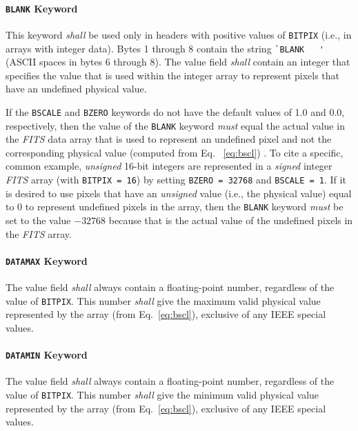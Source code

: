 \documentclass[11pt,makeidx]{book}     %
\begin{document}
   \paragraph{{\tt BLANK} Keyword}
 This keyword {\em shall} be used only in headers with
 positive values of {\tt BITPIX}  (i.e., in arrays
 with integer data). Bytes 1 through 8 contain the string 
 \verb*+`BLANK   '+ (ASCII spaces in bytes 6 through 8).  The value 
 field {\em shall} contain an integer that specifies the value that 
 is used within the integer array to represent pixels that have an
 undefined physical value. 

 If the {\tt BSCALE} and {\tt BZERO} keywords do not have the
 default values of 1.0 and 0.0, respectively, then the value of the
 {\tt BLANK} keyword {\em must} equal the actual value in the {\em
 FITS\/} data array  that is used to represent an undefined pixel
 and not the corresponding physical value (computed from Eq. \
 \ref{eq:bscl}) .  To cite a specific, common example,  {\em
 unsigned} 16-bit integers are represented in a {\em signed}
 integer {\em FITS\/} array (with {\tt BITPIX = 16}) by setting 
 {\tt BZERO = 32768} and {\tt BSCALE = 1}.  If it is desired  to
 use pixels that have an {\em unsigned} value (i.e., the physical
 value) equal to 0 to represent  undefined pixels in the array,
 then the {\tt BLANK}  keyword {\em must} be set to the value
 $-32768$   because that is the actual value of the undefined pixels in the
 {\em FITS\/}  array. 

   \paragraph{{\tt DATAMAX} Keyword}
 The value field {\em shall} always contain a floating-point
 number, regardless of the value of {\tt BITPIX}. This\index{BITPIX}
 number {\em shall} give the maximum valid physical value 
 represented by the array (from Eq.\ \ref{eq:bscl}), exclusive of 
 any\index{IEEE special values} IEEE special values.
  
   \paragraph{{\tt DATAMIN} Keyword}
 The value field {\em shall} always contain a floating-point
 number, regardless of the value of {\tt BITPIX}. This\index{BITPIX}
 number {\em shall} give the minimum valid physical value 
 represented by the array  (from Eq.\ \ref{eq:bscl}), exclusive of any
 IEEE special values.
  
\end{document}
